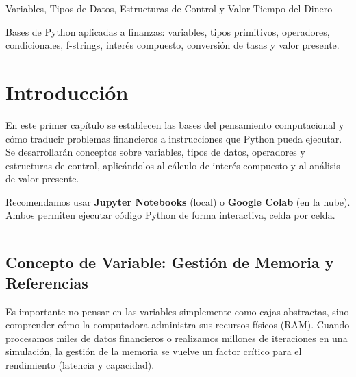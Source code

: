 \documentclass[
  spanish,
  letterpaper,
  DIV=11,
  numbers=noendperiod]{scrreprt}
\begin{document}
Variables, Tipos de Datos, Estructuras de Control y Valor Tiempo del
Dinero

Bases de Python aplicadas a finanzas: variables, tipos primitivos,
operadores, condicionales, f-strings, interés compuesto, conversión de
tasas y valor presente.

\hfill\break

\chapter*{Introducción}\label{introducciuxf3n}


En este primer capítulo se establecen las bases del pensamiento
computacional y cómo traducir problemas financieros a instrucciones que
Python pueda ejecutar. Se desarrollarán conceptos sobre variables, tipos
de datos, operadores y estructuras de control, aplicándolos al cálculo
de interés compuesto y al análisis de valor presente.

\begin{tcolorbox}[enhanced jigsaw, bottomrule=.15mm, colback=white, opacitybacktitle=0.6, arc=.35mm, toprule=.15mm, opacityback=0, breakable, titlerule=0mm, left=2mm, coltitle=black, colbacktitle=quarto-callout-tip-color!10!white, colframe=quarto-callout-tip-color-frame, leftrule=.75mm, toptitle=1mm, bottomtitle=1mm, title=\textcolor{quarto-callout-tip-color}{\faLightbulb}\hspace{0.5em}{Entorno de Trabajo}, rightrule=.15mm]

Recomendamos usar \textbf{Jupyter Notebooks} (local) o \textbf{Google
Colab} (en la nube). Ambos permiten ejecutar código Python de forma
interactiva, celda por celda.

\end{tcolorbox}

\begin{center}\rule{0.5\linewidth}{0.5pt}\end{center}

\section{Concepto de Variable: Gestión de Memoria y
Referencias}\label{concepto-de-variable-gestiuxf3n-de-memoria-y-referencias}

Es importante no pensar en las variables simplemente como cajas
abstractas, sino comprender cómo la computadora administra sus recursos
físicos (RAM). Cuando procesamos miles de datos financieros o realizamos
millones de iteraciones en una simulación, la gestión de la memoria se
vuelve un factor crítico para el rendimiento (latencia y capacidad).
\end{document}
